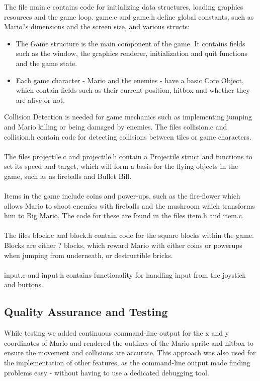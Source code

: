 \documentclass[11pt,twoside]{article}
\begin{document}
The file main.c contains code for initializing data structures, loading graphics resources and the game loop. game.c and game.h define global constants, such as Mario?s dimensions and the screen size, and various structs:
\begin{itemize}
\item The Game structure is the main component of the game. It contains fields such as the window, the graphics renderer, initialization and quit functions and the game state.
\item Each game character - Mario and the enemies - have a basic Core Object, which contain fields such as their current position, hitbox and whether they are alive or not.
\end{itemize}

Collision Detection is needed for game mechanics such as implementing jumping and Mario killing or being damaged by enemies. The files collision.c and collision.h contain code for detecting collisions between tiles or game characters.
\\\\
The files projectile.c and projectile.h contain a Projectile struct and functions to set its speed and target, which will form a basis for the flying objects in the game, such as as fireballs and Bullet Bill.
\\\\
Items in the game include coins and power-ups, such as the fire-flower which allows Mario to shoot enemies with fireballs and the mushroom which transforms him to Big Mario. The code for these are found in the files item.h and item.c.
\\\\
The files block.c and block.h contain code for the square blocks within the game. Blocks are either ? blocks, which reward Mario with either coins or powerups when jumping from underneath, or destructible bricks.
\\\\
input.c and input.h contains functionality for handling input from the joystick and buttons.

\subsection{Quality Assurance and Testing}
While testing we added continuous command-line output for the x and y coordinates of Mario and rendered the outlines of the Mario sprite and hitbox to ensure the movement and collisions are accurate. This approach was also used for the implementation of other features, as the command-line output made finding problems easy - without having to use a dedicated debugging tool.
\end{document}
